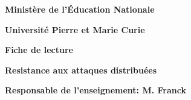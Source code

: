 
\makeatletter
\thispagestyle{empty}

\begin{center}
	\noindent \textbf{Ministère de l'Éducation Nationale}
	\vspace{0.8cm}

	\noindent \textbf{Université Pierre et Marie Curie}

	\vspace{4.0cm}

	\noindent \LARGE{\textbf{Fiche de lecture}}

	\vspace{1.0cm}

	\noindent \LARGE{\@title}

	\vspace{5.0cm}

	\noindent \normalsize{\@author}

	\noindent \textbf{Resistance aux attaques distribuées}

	\vspace{2.5cm}

	\noindent \textbf{Responsable de l'enseignement: M. Franck }

    \vspace{0.7cm}

\end{center}

\makeatother

\pagebreak
\thispagestyle{empty}


